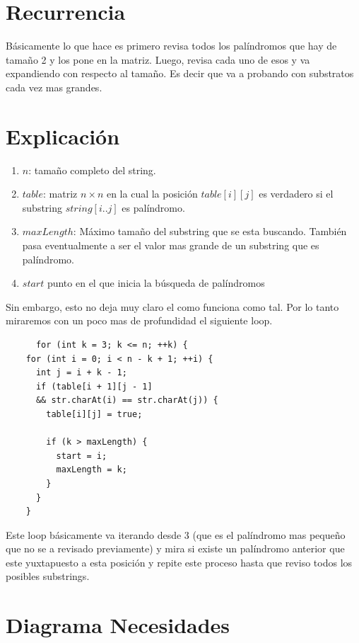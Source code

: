 \documentclass{report}
\begin{document}
		       \section{Recurrencia}

		       Básicamente lo que hace es primero revisa todos los palíndromos que hay de tamaño 2 y los pone en la matriz. Luego, revisa cada uno de esos y va expandiendo con respecto al tamaño. Es decir que va a probando con substratos cada vez mas grandes.

		       \section{Explicación}
		       \begin{enumerate}
			 \item $n$: tamaño completo del string.
			 \item $table$: matriz  $n\times n$ en la cual la posición $table[i][j]$ es verdadero si el substring $string[i..j]$ es palíndromo.
			 \item $maxLength$: Máximo tamaño del substring que se esta buscando. También pasa eventualmente a ser el valor mas grande de un substring que es palíndromo.
			 \item $start$ punto en el que inicia la búsqueda de palíndromos 
		       \end{enumerate}

		       Sin embargo, esto no deja muy claro el como funciona como tal. Por lo tanto miraremos con un poco mas de profundidad el siguiente loop.
		       \begin{verbatim}
      for (int k = 3; k <= n; ++k) {
	for (int i = 0; i < n - k + 1; ++i) {
	  int j = i + k - 1;
	  if (table[i + 1][j - 1]
	  && str.charAt(i) == str.charAt(j)) {
	    table[i][j] = true;

	    if (k > maxLength) {
	      start = i;
	      maxLength = k;
	    }
	  }
	}
		       \end{verbatim}

		       Este loop básicamente va iterando desde 3 (que es el palíndromo mas pequeño que no se a revisado previamente) y mira si existe un palíndromo anterior que este yuxtapuesto a esta posición y repite este proceso hasta que reviso todos los posibles substrings.

		       \section{Diagrama Necesidades}
\end{document}
